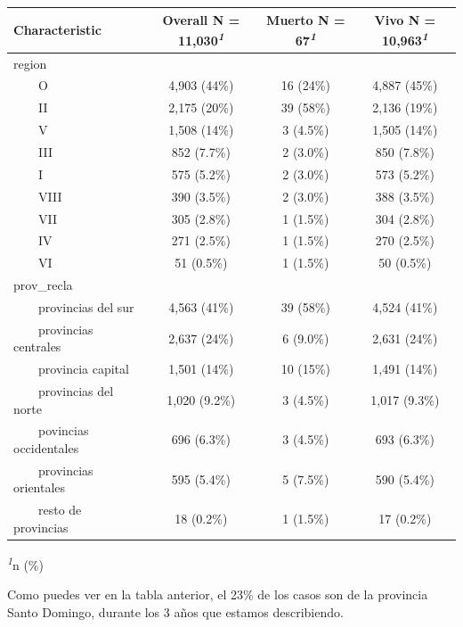 \documentclass[
  letterpaper,
  DIV=11,
  numbers=noendperiod]{scrreprt}
\begin{document}
\begin{table}
\fontsize{12.0pt}{14.4pt}\selectfont
\begin{tabular*}{\linewidth}{@{\extracolsep{\fill}}lccc}
\toprule
\textbf{Characteristic} & \textbf{Overall}  N = 11,030\textsuperscript{\textit{1}} & \textbf{Muerto}  N = 67\textsuperscript{\textit{1}} & \textbf{Vivo}  N = 10,963\textsuperscript{\textit{1}} \\ 
\midrule\addlinespace[2.5pt]
region &  &  &  \\ 
    O & 4,903 (44\%) & 16 (24\%) & 4,887 (45\%) \\ 
    II & 2,175 (20\%) & 39 (58\%) & 2,136 (19\%) \\ 
    V & 1,508 (14\%) & 3 (4.5\%) & 1,505 (14\%) \\ 
    III & 852 (7.7\%) & 2 (3.0\%) & 850 (7.8\%) \\ 
    I & 575 (5.2\%) & 2 (3.0\%) & 573 (5.2\%) \\ 
    VIII & 390 (3.5\%) & 2 (3.0\%) & 388 (3.5\%) \\ 
    VII & 305 (2.8\%) & 1 (1.5\%) & 304 (2.8\%) \\ 
    IV & 271 (2.5\%) & 1 (1.5\%) & 270 (2.5\%) \\ 
    VI & 51 (0.5\%) & 1 (1.5\%) & 50 (0.5\%) \\ 
prov\_recla &  &  &  \\ 
    provincias del sur & 4,563 (41\%) & 39 (58\%) & 4,524 (41\%) \\ 
    provincias centrales & 2,637 (24\%) & 6 (9.0\%) & 2,631 (24\%) \\ 
    provincia capital & 1,501 (14\%) & 10 (15\%) & 1,491 (14\%) \\ 
    provincias del norte & 1,020 (9.2\%) & 3 (4.5\%) & 1,017 (9.3\%) \\ 
    povincias occidentales & 696 (6.3\%) & 3 (4.5\%) & 693 (6.3\%) \\ 
    provincias orientales & 595 (5.4\%) & 5 (7.5\%) & 590 (5.4\%) \\ 
    resto de provincias & 18 (0.2\%) & 1 (1.5\%) & 17 (0.2\%) \\ 
\bottomrule
\end{tabular*}
\begin{minipage}{\linewidth}
\textsuperscript{\textit{1}}n (\%)\\
\end{minipage}
\end{table}

Como puedes ver en la tabla anterior, el 23\% de los casos son de la
provincia Santo Domingo, durante los 3 años que estamos describiendo.
\end{document}
